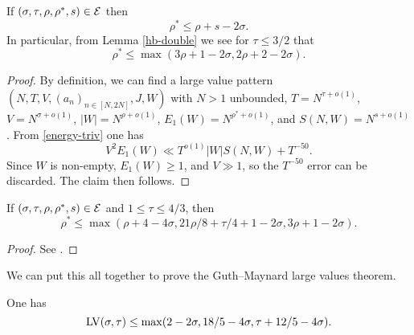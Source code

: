 \begin{lemma}\cite[Lemma 1.7]{guth-maynard}  If $(\sigma,\tau,\rho,\rho^*,s) \in \mathcal{E}$ then
$$ \rho^* \leq \rho + s - 2\sigma.$$
In particular, from Lemma \ref{hb-double} we see for $\tau \leq 3/2$ that
$$ \rho^* \leq \max(3\rho+1-2\sigma, 2\rho+2-2\sigma).$$
\end{lemma}

\begin{proof} By definition, we can find a large value pattern $(N,T,V,(a_n)_{n \in [N,2N]},J,W)$ with $N>1$ unbounded, $T = N^{\tau+o(1)}$, $V = N^{\sigma+o(1)}$, $|W| = N^{\rho+o(1)}$, $E_1(W) = N^{\rho^*+o(1)}$, and $S(N,W) = N^{s+o(1)}$. From \eqref{energy-triv} one has
$$    V^2 E_1(W) \ll T^{o(1)} |W| S(N,W) + T^{-50}.$$
Since $W$ is non-empty, $E_1(W) \geq 1$, and $V \gg 1$, so the $T^{-50}$ error can be discarded.  The claim then follows.
\end{proof}


\begin{lemma}\label{gm-3}  If $(\sigma,\tau,\rho,\rho^*, s) \in \mathcal{E}$ and $1 \leq \tau \leq 4/3$, then
    $$ \rho^* \leq \max(\rho+4-4\sigma, 21\rho/8+\tau/4+1-2\sigma, 3\rho+1-2\sigma).$$
\end{lemma}

\begin{proof} See \cite[Proposition 11.1]{guth-maynard}.
\end{proof}

We can put this all together to prove the Guth--Maynard large values theorem.

\begin{theorem}\label{guth-maynard-lvt}\cite[Theorem~1.1]{guth-maynard} One has
    $$ \mathrm{LV}(\sigma,\tau) \leq \max(2-2\sigma, 18/5 - 4 \sigma, \tau + 12/5 - 4\sigma).$$
\end{theorem}

\literature
{}

